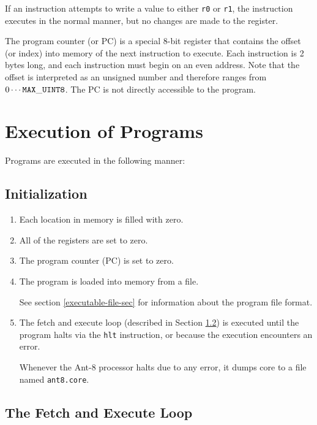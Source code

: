 If an instruction attempts to write a value to either {\tt r0}
or {\tt r1}, the instruction executes in the normal manner,
but no changes are made to the register.

The program counter (or {\sc PC}) is a special 8-bit register that
contains the offset (or index) into memory of the next instruction to
execute.  Each instruction is 2 bytes long, and each instruction must
begin on an even address.  Note that the offset is interpreted as an
unsigned number and therefore ranges from $0 \cdots {\bf\tt MAX\_UINT8}$. 
The {\sc PC} is not directly accessible to the program.

\section{Execution of Programs}

Programs are executed in the following manner:

\subsection{Initialization}

\begin{enumerate}


	\item Each location in memory is filled with zero.

	\item All of the registers are set to zero.

	\item The program counter (PC) is set to zero.

	\item The program is loaded into memory from a file.

		See section \ref{executable-file-sec} for information
		about the program file format.

	\item The fetch and execute loop (described in Section
		\ref{fetch-and-exec}) is executed until the program
		halts via the {\tt hlt} instruction, or because the
		execution encounters an error.
	
		Whenever the {\sc Ant-8} processor halts due to any error,
		it dumps core to a file named {\tt ant8.core}.

\end{enumerate}

\subsection{The Fetch and Execute Loop}
\label{fetch-and-exec}

